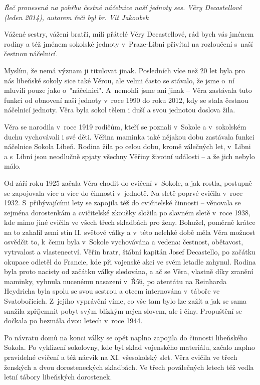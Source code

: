\documentclass[a5paper, 12pt, twoside]{article}
\begin{document}
\textit{Řeč pronesená na pohřbu čestné náčelnice naší jednoty ses. Věry
Decastellové (leden 2014), autorem řeči byl br. Vít Jakoubek}

Vážené sestry, vážení bratři, milí přátelé Věry Decastellové, rád bych
vás jménem rodiny a též jménem sokolské jednoty v~Praze-Libni přivítal
na rozloučení s~naší čestnou náčelnicí.

Myslím, že nemá význam ji titulovat jinak. Posledních více než 20 let
byla pro nás libeňské sokoly sice také Věrou, ale velmi často se
stávalo, že jsme o~ní mluvili pouze jako o~"náčelnici". A~nemohli jsme
ani jinak -- Věra zastávala tuto funkci od obnovení naší jednoty v~roce
1990 do roku 2012, kdy se stala čestnou náčelnicí jednoty. Věra byla
sokol tělem i duší a svou jednotou doslova žila.

Věra se narodila v~roce 1919 rodičům, kteří se poznali v~Sokole a
v~sokolském duchu vychovávali i své děti. Věřina maminka také nějakou dobu
zastávala funkci náčelnice Sokola Libeň. Rodina žila po celou dobu,
kromě válečných let, v~Libni a s~Libní jsou neodlučně spjaty všechny
Věřiny životní události -- a že jich nebylo málo.

Od září roku 1925 začala Věra chodit do cvičení v~Sokole, a jak rostla,
postupně se zapojovala více a více do činnosti v~jednotě. Na sletě
poprvé cvičila v~roce 1932. S~přibývajícími lety se zapojila též do
cvičitelské činnosti -- věnovala se zejména dorostenkám a cvičitelské
zkoušky složila po slavném sletě v~roce 1938, kde mimo jiné cvičila ve
všech třech skladbách pro ženy. Bohužel, poměrně krátce na to zahalil
zemi stín II. světové války a v~této nelehké době měla Věra možnost
osvědčit to, k~čemu byla v~Sokole vychovávána a vedena: čestnost,
obětavost, vytrvalost a vlastenectví. Věřin bratr, štábní kapitán Josef
Decastello, po začátku okupace odletěl do Francie, kde při vojenské akci
ve svém letadle zahynul. Rodina byla proto nacisty od začátku války
sledována, a ač se Věra, vlastně díky zranění maminky, vyhnula nucenému
nasazení v~Říši, po atentátu na Reinharda Heydricha byla spolu se svou
sestrou a otcem internována v~táboře ve Svatobořicích. Z~jejího
vyprávění víme, co vše tam bylo lze zažít a jak se sama snažila
zpříjemnit pobyt svým blízkým nejen slovem, ale i činy. Propuštění se
dočkala po bezmála dvou letech v~roce 1944.

Po návratu domů na konci války se opět naplno zapojila do činnosti
libeňského Sokola. Po vyklizení sokolovny, kde byl sklad vojenského
materiálu, začalo naplno pravidelné cvičení a též nácvik na XI.
všesokolský slet. Věra cvičila ve třech ženských a dvou dorosteneckých
skladbách. Ve třech poválečných letech též vedla letní tábory libeňských
dorostenek.
\end{document}
